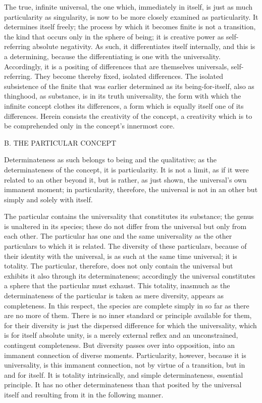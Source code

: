The true, infinite universal,
the one which, immediately in itself,
is just as much particularity as singularity,
is now to be more closely examined as particularity.
It determines itself freely;
the process by which it becomes finite
is not a transition,
the kind that occurs only
in the sphere of being;
it is creative power as
self-referring absolute negativity.
As such, it differentiates itself internally,
and this is a determining,
because the differentiating is
one with the universality.
Accordingly, it is a positing of differences
that are themselves universals, self-referring.
They become thereby fixed, isolated differences.
The isolated subsistence of the finite
that was earlier determined as its being-for-itself,
also as thinghood, as substance,
is in its truth universality,
the form with which the infinite concept
clothes its differences,
a form which is equally itself one of its differences.
Herein consists the creativity of the concept,
a creativity which is to be comprehended
only in the concept's innermost core.

B. THE PARTICULAR CONCEPT

Determinateness as such belongs to being and the qualitative;
as the determinateness of the concept, it is particularity.
It is not a limit, as if it were related to an other beyond it,
but is rather, as just shown, the universal's own immanent moment;
in particularity, therefore, the universal is not
in an other but simply and solely with itself.

The particular contains the universality
that constitutes its substance;
the genus is unaltered in its species;
these do not differ from the universal
but only from each other.
The particular has one and the same universality as
the other particulars to which it is related.
The diversity of these particulars,
because of their identity with the universal, is
as such at the same time universal;
it is totality.
The particular, therefore,
does not only contain the universal
but exhibits it also through its determinateness;
accordingly the universal constitutes a sphere
that the particular must exhaust.
This totality, inasmuch as the determinateness
of the particular is taken as mere diversity,
appears as completeness.
In this respect, the species are complete
simply in so far as there are no more of them.
There is no inner standard or principle available for them,
for their diversity is just the dispersed difference
for which the universality,
which is for itself absolute unity,
is a merely external reflex
and an unconstrained, contingent completeness.
But diversity passes over into opposition,
into an immanent connection of diverse moments.
Particularity, however,
because it is universality,
is this immanent connection,
not by virtue of a transition,
but in and for itself.
It is totality intrinsically,
and simple determinateness,
essential principle.
It has no other determinateness than
that posited by the universal itself
and resulting from it in the following manner.

